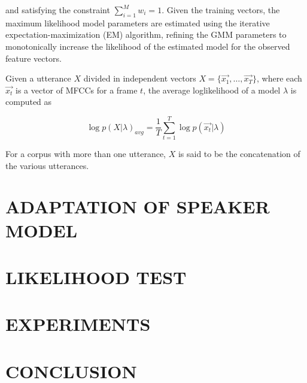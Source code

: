 \documentclass[a4paper,twocolumn]{article}
\begin{document}
\noindent and satisfying the constraint $\sum_{i=1}^M w_i = 1$. Given the training vectors, the maximum likelihood model parameters are estimated using the iterative expectation-maximization (EM) algorithm, refining the GMM parameters to monotonically increase the likelihood of the estimated model for the observed feature vectors.

Given a utterance $X$ divided in independent vectors $X = \{\vec{x_1}, \dots, \vec{x_T}\}$, where each $\vec{x_t}$ is a vector of MFCCs for a frame $t$, the average loglikelihood of a model $\lambda$ is computed as

\begin{equation}
    \label{eq:loglikelihood_lambda}
    \log p(X|\lambda)_{avg} = \frac{1}{T}\sum_{t=1}^T \log p(\vec{x_t}|\lambda)
\end{equation}

\noindent For a corpus with more than one utterance, $X$ is said to be the concatenation of the various utterances.


\section{ADAPTATION OF SPEAKER MODEL}


\section{LIKELIHOOD TEST}


\section{EXPERIMENTS}


\section{CONCLUSION}
\end{document}
